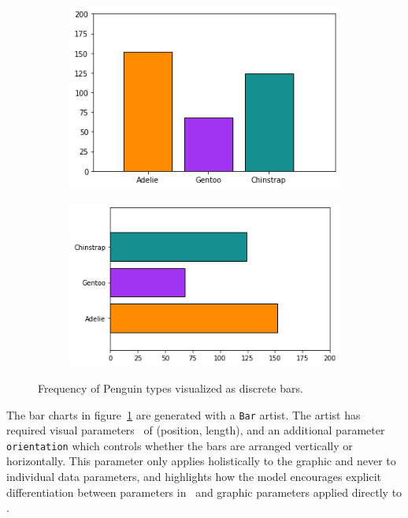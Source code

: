 \documentclass[../main.tex]{subfiles}
\begin{document}
\begin{figure}[H]
    \begin{subfigure}{0.5\textwidth}
        \includegraphics[width=\textwidth]{figures/code/bar_v.png}
    \end{subfigure}
    \begin{subfigure}{0.5\textwidth}
        \includegraphics[width=\textwidth]{figures/code/bar_h.png}
    \end{subfigure}
    \caption{Frequency of Penguin types visualized as discrete bars. }
    \label{fig:code_bar_simple}
\end{figure}
The bar charts in figure~\ref{fig:code_bar_simple} are generated with a \texttt{Bar} artist. The artist has required visual parameters \vfiber\ of (position, length), and an additional parameter \texttt{orientation} which controls whether the bars are arranged vertically or horizontally. This parameter only applies holistically to the graphic and never to individual data parameters, and highlights how the model encourages explicit differentiation between parameters in \vtotal\ and graphic parameters applied directly to \vmarkd. 
\end{document}
